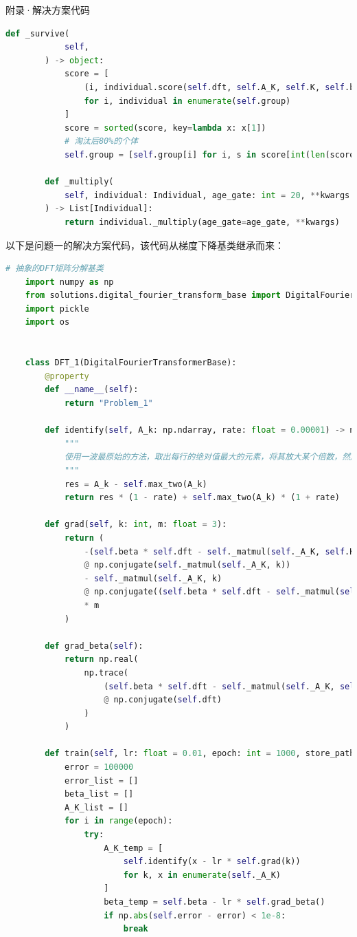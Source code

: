 \documentclass[11pt]{article}
\begin{document}
\begin{section}{附录·解决方案代码}
\begin{lstlisting}[language=Python]
        def _survive(
            self,
        ) -> object:
            score = [
                (i, individual.score(self.dft, self.A_K, self.K, self.beta))
                for i, individual in enumerate(self.group)
            ]
            score = sorted(score, key=lambda x: x[1])
            # 淘汰后80%的个体
            self.group = [self.group[i] for i, s in score[int(len(score) * 0.85):]]
    
        def _multiply(
            self, individual: Individual, age_gate: int = 20, **kwargs
        ) -> List[Individual]:
            return individual._multiply(age_gate=age_gate, **kwargs)
  \end{lstlisting}
 以下是问题一的解决方案代码，该代码从梯度下降基类继承而来：
 \begin{lstlisting}[language=Python]
    # 抽象的DFT矩阵分解基类
    import numpy as np
    from solutions.digital_fourier_transform_base import DigitalFourierTransformerBase
    import pickle
    import os
    
    
    class DFT_1(DigitalFourierTransformerBase):
        @property
        def __name__(self):
            return "Problem_1"
    
        def identify(self, A_k: np.ndarray, rate: float = 0.00001) -> np.ndarray:
            """
            使用一波最原始的方法，取出每行的绝对值最大的元素，将其放大某个倍数，然后将第二大的也放大这个位数，将其他的缩小某个倍数。
            """
            res = A_k - self.max_two(A_k)
            return res * (1 - rate) + self.max_two(A_k) * (1 + rate)
    
        def grad(self, k: int, m: float = 3):
            return (
                -(self.beta * self.dft - self._matmul(self._A_K, self.K))
                @ np.conjugate(self._matmul(self._A_K, k))
                - self._matmul(self._A_K, k)
                @ np.conjugate((self.beta * self.dft - self._matmul(self._A_K, self.K)))
                * m
            )
    
        def grad_beta(self):
            return np.real(
                np.trace(
                    (self.beta * self.dft - self._matmul(self._A_K, self.K))
                    @ np.conjugate(self.dft)
                )
            )
    
        def train(self, lr: float = 0.01, epoch: int = 1000, store_path: os.PathLike = './result', **kwargs):
            error = 100000
            error_list = []
            beta_list = []
            A_K_list = []
            for i in range(epoch):
                try:
                    A_K_temp = [
                        self.identify(x - lr * self.grad(k))
                        for k, x in enumerate(self._A_K)
                    ]
                    beta_temp = self.beta - lr * self.grad_beta()
                    if np.abs(self.error - error) < 1e-8:
                        break
    

\end{lstlisting}
\end{section}
\end{document}
